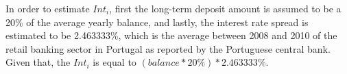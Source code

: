 In order to estimate $Int_i$, first the long-term deposit amount is assumed to be a 20\% of the 
average yearly balance, and lastly, the interest rate spread is estimated to be 2.463333\%,	which 
is the average between 2008 and 2010 of the retail banking sector in Portugal as reported by the 
Portuguese central bank. Given that, the $Int_i$ is equal to $\left( balance * 20\% \right) * 
2.463333\%$.
		
%  
% 	
